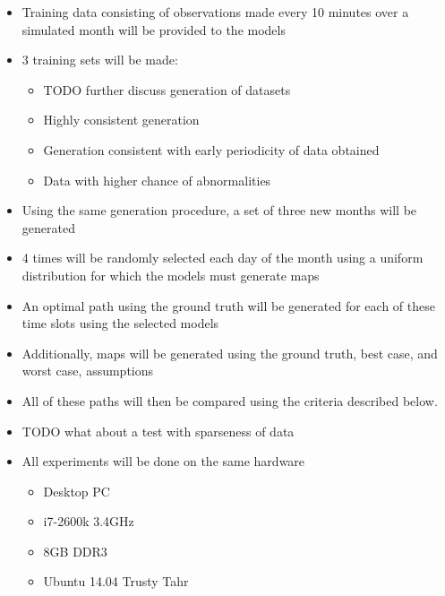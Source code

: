 \begin{itemize}

  \item Training data consisting of observations made every 10 minutes over a simulated month will
        be provided to the models

  \item 3 training sets will be made:
    \begin{itemize}

      \item TODO further discuss generation of datasets

      \item Highly consistent generation

      \item Generation consistent with early periodicity of data obtained

      \item Data with higher chance of abnormalities

    \end{itemize}

  \item Using the same generation procedure, a set of three new months will be
        generated

  \item 4 times will be randomly selected each day of the month using a
        uniform distribution for which the models must generate maps

  \item An optimal path using the ground truth will be generated for each of
        these time slots using the selected models

  \item Additionally, maps will be generated using the ground truth, best
        case, and worst case, assumptions

  \item All of these paths will then be compared using the criteria described
        below.

  \item TODO what about a test with sparseness of data

  \item All experiments will be done on the same hardware
    \begin{itemize}
      \item Desktop PC
      \item i7-2600k 3.4GHz
      \item 8GB DDR3
      \item Ubuntu 14.04 Trusty Tahr
    \end{itemize}

\end{itemize}


